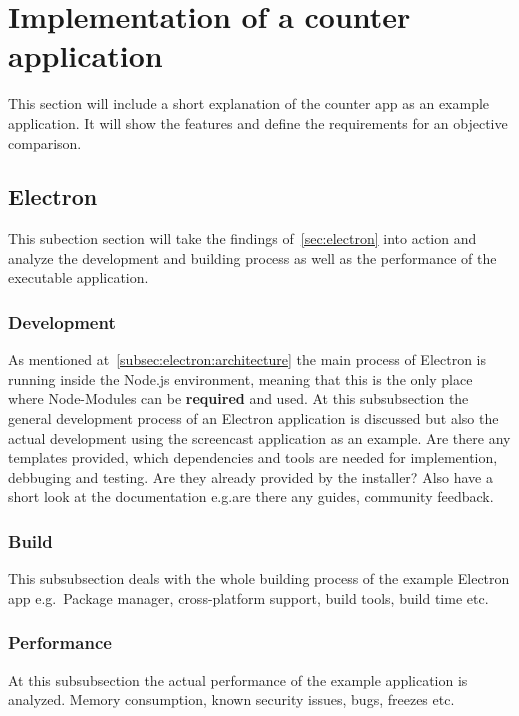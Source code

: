 \section{Implementation of a counter application}
\label{sec:implementation}
This section will include a short explanation of the counter app as an example application.
It will show the features and define the requirements for an objective comparison.

\subsection{Electron}
\label{subsec:impl:electron}
This subection section will take the findings of~\ref{sec:electron} into action and analyze the development and building process as well as the performance of the executable application.

\subsubsection{Development}
\label{subsubsec:impl:electron:dev}
As mentioned at~\ref{subsec:electron:architecture} the main process of Electron is running inside the Node.js environment, meaning that this is the only place where Node-Modules can be \textbf{required} and used.
At this subsubsection the general development process of an Electron application is discussed but also the actual development using the screencast
application as an example.
Are there any templates provided, which dependencies and tools are needed for implemention, debbuging and testing.
Are they already provided by the installer?
Also have a short look at the documentation e.g.are there any guides, community feedback.

\subsubsection{Build}
\label{subsubsec:impl:electron:build}
This subsubsection deals with the whole building process of the example Electron app e.g.\ Package manager, cross-platform support, build tools, build time etc.

\subsubsection{Performance}
\label{subsubsec:impl:electron:performance}
At this subsubsection the actual performance of the example application is analyzed.
Memory consumption, known security issues, bugs, freezes etc.

